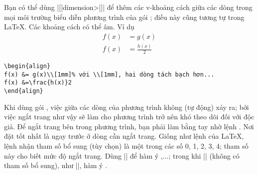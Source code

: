 Bạn có thể dùng \cn{\\}|[|\<dimension>|]| để thêm các v-khoảng cách giữa
các dòng trong mọi môi trường biểu diễn phương trình của gói ;
điều này cũng tương tự trong \LaTeX{}. Các khoảng cách có thể âm. Ví dụ
\begin{align}
f(x) &= g(x)\\[1mm]
f(x) &=\frac{h(x)}2
\end{align}
\begin{verbatim}
\begin{align}
f(x) &= g(x)\\[1mm]% với \\[1mm], hai dòng tách bạch hơn...
f(x) &=\frac{h(x)}2
\end{align}
\end{verbatim}

\medskip
Khi dùng gói , việc  giữa các dòng của phương trình
không (tự động) xảy ra; bởi việc ngắt trang như vậy sẽ làm cho phương trình trở nên
khó theo dõi đối với độc giả.
Để ngắt trang bên trong phương trình, bạn phải làm bằng tay nhờ lệnh
.
Nơi đặt  tốt nhất là ngay trước \cn{\\} ở dòng cần ngắt trang.
Giống như lệnh  của \LaTeX{}, lệnh  nhận
tham số bổ sung (tùy chọn) là một trong các số 0, 1, 2, 3, 4;
tham số này cho biết mức độ ngắt trang. Dùng |\displaybreak[0]| để hàm ý
,...; trong khi |\displaybreak|
(không có tham số bổ sung), như |\displaybreak[4]|, hàm ý
.

